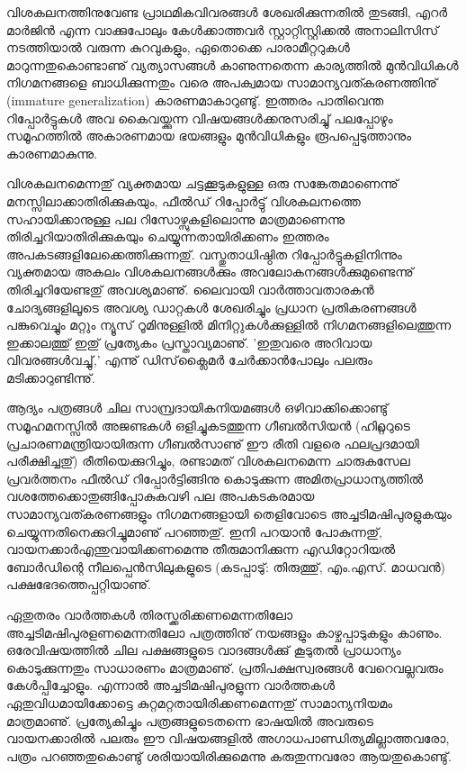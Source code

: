 വിശകലനത്തിനുവേണ്ട പ്രാഥമികവിവരങ്ങള്‍ ശേഖരിക്കുന്നതില്‍ തുടങ്ങി, എറര്‍ മാര്‍ജിന്‍ എന്ന വാക്കുപോലും 
കേള്‍ക്കാത്തവര്‍ സ്റ്റാറ്റിസ്റ്റിക്കല്‍ അനാലിസിസ് നടത്തിയാല്‍ വരുന്ന കുറവുകളും, ഏതൊക്കെ പാരാമീറ്ററുകള്‍ 
മാറുന്നതുകൊണ്ടാണു് വ്യത്യാസങ്ങള്‍ കാണുന്നതെന്ന കാര്യത്തില്‍ മുന്‍വിധികള്‍ നിഗമനങ്ങളെ ബാധിക്കുന്നതും വരെ 
അപക്വമായ സാമാന്യവത്കരണത്തിനു് (immature generalization) കാരണമാകാറുണ്ടു്. ഇത്തരം പാതിവെന്ത 
റിപ്പോര്‍ട്ടുകള്‍ അവ കൈവയ്ക്കുന്ന വിഷയങ്ങള്‍ക്കനുസരിച്ചു് പലപ്പോഴും സമൂഹത്തില്‍ അകാരണമായ ഭയങ്ങളും 
മുന്‍വിധികളും രൂപപ്പെടുത്താനും കാരണമാകുന്നു.

വിശകലനമെന്നതു് വ്യക്തമായ ചട്ടക്കൂടുകളുള്ള ഒരു സങ്കേതമാണെന്നു് മനസ്സിലാക്കാതിരിക്കുകയും, ഫീല്‍ഡ് 
റിപ്പോര്‍ട്ടു് വിശകലനത്തെ സഹായിക്കാനുള്ള പല റിസോഴ്സുകളിലൊന്നു മാത്രമാണെന്നു തിരിച്ചറിയാതിരിക്കുകയും 
ചെയ്യുന്നതായിരിക്കണം ഇത്തരം അപകടങ്ങളിലേക്കെത്തിക്കുന്നതു്. വസ്തുതാധിഷ്ഠിത റിപ്പോര്‍ട്ടുകളിനിന്നും 
വ്യക്തമായ അകലം വിശകലനങ്ങള്‍ക്കും അവലോകനങ്ങള്‍ക്കുമുണ്ടെന്നു് തിരിച്ചറിയേണ്ടതു് അവശ്യമാണു്. ലൈവായി 
വാര്‍ത്താവതാരകന്‍ ചോദ്യങ്ങളിലൂടെ അവശ്യ ഡാറ്റകള്‍ ശേഖരിച്ചും പ്രധാന പ്രതികരണങ്ങള്‍ പങ്കുവെച്ചും മറ്റും ന്യൂസ് 
റൂമിനുള്ളില്‍ മിനിറ്റുകള്‍ക്കുള്ളില്‍ നിഗമനങ്ങളിലെത്തുന്ന ഇക്കാലത്തു് ഇതു് പ്രത്യേകം പ്രസ്താവ്യമാണു്. 'ഇതുവരെ അറിവായ 
വിവരങ്ങള്‍വച്ചു്,' എന്നു് ഡിസ്‌ക്ലൈമര്‍ ചേര്‍ക്കാന്‍പോലും പലരും മടിക്കാറുണ്ടിന്നു്.‌

ആദ്യം പത്രങ്ങള്‍ ചില സാമ്പ്രദായികനിയമങ്ങള്‍ ഒഴിവാക്കിക്കൊണ്ടു് സമൂഹമനസ്സില്‍ അജണ്ടകള്‍ ഒളിച്ചുകടത്തുന്ന 
ഗീബല്‍സിയന്‍ (ഹിറ്റ്ലറുടെ പ്രചാരണമന്ത്രിയായിരുന്ന ഗീബല്‍സാണു് ഈ രീതി വളരെ ഫലപ്രദമായി പരീക്ഷിച്ചതു്) 
രീതിയെക്കുറിച്ചും, രണ്ടാമത് വിശകലനമെന്ന ചാരുകസേല പ്രവര്‍ത്തനം ഫീല്‍ഡ് റിപ്പോര്‍ട്ടിങ്ങിനു കൊടുക്കുന്ന 
അമിതപ്രാധാന്യത്തില്‍ വശത്തേക്കൊതുങ്ങിപ്പോകുകവഴി പല അപകടകരമായ സാമാന്യവത്കരണങ്ങളും 
നിഗമനങ്ങളായി തെളിവോടെ അച്ചടിമഷിപുരളുകയും ചെയ്യുന്നതിനെക്കുറിച്ചുമാണു് പറഞ്ഞതു്. ഇനി പറയാന്‍ പോകുന്നതു്, 
വായനക്കാര്‍എന്തുവായിക്കണമെന്നു തീരുമാനിക്കുന്ന എഡിറ്റോറിയല്‍ ബോര്‍ഡിന്റെ നീലപ്പെന്‍സിലുകളുടെ 
(കടപ്പാടു്: തിരുത്തു്, എം.എസ്. മാധവന്‍) പക്ഷഭേദത്തെപ്പറ്റിയാണു്.

ഏതുതരം വാര്‍ത്തകള്‍ തിരസ്ക്കരിക്കണമെന്നതിലോ അച്ചടിമഷിപുരളണമെന്നതിലോ പത്രത്തിനു് നയങ്ങളും 
കാഴ്ചപ്പാടുകളും കാണും. ഒരേവിഷയത്തില്‍ ചില പക്ഷങ്ങളുടെ വാദങ്ങള്‍ക്കു് കൂടുതല്‍ പ്രാധാന്യം കൊടുക്കുന്നതും 
സാധാരണം മാത്രമാണു്. പ്രതിപക്ഷസ്വരങ്ങള്‍ വേറെവല്ലവരും കേള്‍പ്പിച്ചോളും. എന്നാല്‍ അച്ചടിമഷിപുരളുന്ന 
വാര്‍ത്തകള്‍ ഏതുവിധമായിക്കോട്ടെ കുറ്റമറ്റതായിരിക്കണമെന്നതു് സാമാന്യനിയമം മാത്രമാണു്. പ്രത്യേകിച്ചും 
പത്രങ്ങളുടെതന്നെ ഭാഷയില്‍ അവരുടെ വായനക്കാരില്‍ പലരും ഈ വിഷയങ്ങളില്‍ 
അഗാധപാണ്ഡിത്യമില്ലാത്തവരോ, പത്രം പറഞ്ഞതുകൊണ്ടു് ശരിയായിരിക്കുമെന്നു കരുതുന്നവരോ ആയതുകൊണ്ടു്.

